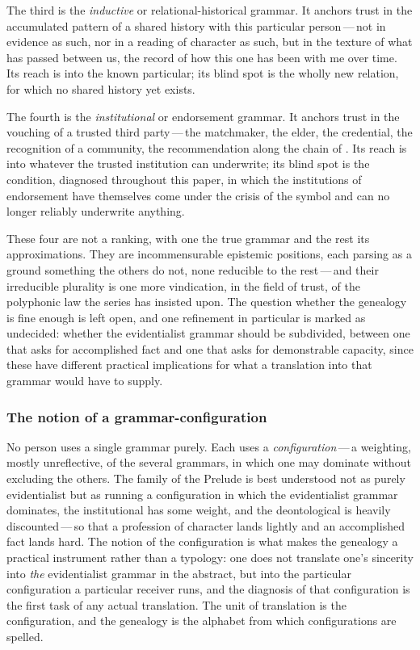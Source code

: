 The third is the \emph{inductive} or relational-historical grammar. It anchors trust in the accumulated pattern of a shared history with this particular person\,---\,not in evidence as such, nor in a reading of character as such, but in the texture of what has passed between us, the record of how this one has been with me over time. Its reach is into the known particular; its blind spot is the wholly new relation, for which no shared history yet exists.

The fourth is the \emph{institutional} or endorsement grammar. It anchors trust in the vouching of a trusted third party\,---\,the matchmaker, the elder, the credential, the recognition of a community, the recommendation along the chain of . Its reach is into whatever the trusted institution can underwrite; its blind spot is the condition, diagnosed throughout this paper, in which the institutions of endorsement have themselves come under the crisis of the symbol and can no longer reliably underwrite anything.

These four are not a ranking, with one the true grammar and the rest its approximations. They are incommensurable epistemic positions, each parsing as a ground something the others do not, none reducible to the rest\,---\,and their irreducible plurality is one more vindication, in the field of trust, of the polyphonic law the series has insisted upon. The question whether the genealogy is fine enough is left open, and one refinement in particular is marked as undecided: whether the evidentialist grammar should be subdivided, between one that asks for accomplished fact and one that asks for demonstrable capacity, since these have different practical implications for what a translation into that grammar would have to supply.

\subsubsection{The notion of a grammar-configuration}
\label{p13:sub:trans-configuration}

No person uses a single grammar purely. Each uses a \emph{configuration}\,---\,a weighting, mostly unreflective, of the several grammars, in which one may dominate without excluding the others. The family of the Prelude is best understood not as purely evidentialist but as running a configuration in which the evidentialist grammar dominates, the institutional has some weight, and the deontological is heavily discounted\,---\,so that a profession of character lands lightly and an accomplished fact lands hard. The notion of the configuration is what makes the genealogy a practical instrument rather than a typology: one does not translate one's sincerity into \emph{the} evidentialist grammar in the abstract, but into the particular configuration a particular receiver runs, and the diagnosis of that configuration is the first task of any actual translation. The unit of translation is the configuration, and the genealogy is the alphabet from which configurations are spelled.

